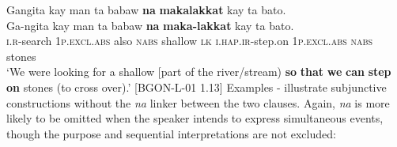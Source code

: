 \ea
\label{bkm:Ref117771448}
Gangita  kay  man  ta  babaw  \textbf{na}  \textbf{makalakkat}  kay ta  bato. \smallskip\\
\gll Ga-ngita  kay  man  ta  babaw  \textbf{na}  \textbf{maka-lakkat}  kay ta  bato. \\
\textsc{i.r}-search  1\textsc{p.excl.abs}  also  \textsc{nabs}  shallow  \textsc{lk}  \textsc{i.hap.ir}-step.on  1\textsc{p.excl.abs}
\textsc{nabs}  stones \\
\glt `We were looking for a shallow [part of the river/stream) \textbf{so} \textbf{that} \textbf{we} \textbf{can} \textbf{step} \textbf{on} stones (to cross over).’ [BGON-L-01 1.13]
\z
Examples - illustrate subjunctive constructions without the \textit{na} linker between the two clauses. Again, \textit{na} is more likely to be omitted when the speaker intends to express simultaneous events, though the purpose and sequential interpretations are not excluded:

